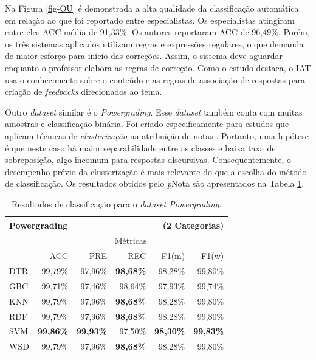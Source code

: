 Na Figura \ref{fig-OU} é demonstrada a alta qualidade da classificação automática em relação ao que foi reportado entre especialistas. Os especialistas atingiram entre eles ACC média de 91,33\%. Os autores \cite{butcher2010} reportaram ACC de 96,49\%. Porém, os três sistemas aplicados utilizam regras e expressões regulares, o que demanda de maior esforço para início das correções. Assim, o sistema deve aguardar enquanto o professor elabora as regras de correção. Como o estudo destaca, o IAT usa o conhecimento sobre o conteúdo e as regras de associação de respostas para criação de \textit{feedbacks} direcionados ao tema.

Outro \textit{dataset} similar é o \textit{Powergrading}. Esse \textit{dataset} também conta com muitas amostras e classificação binária. Foi criado especificamente para estudos que aplicam técnicas de \textit{clusterização} na atribuição de notas \cite{basu2013}. Portanto, uma hipótese é que neste caso há maior separabilidade entre as classes e baixa taxa de sobreposição, algo incomum para respostas discursivas. Consequentemente, o desempenho prévio da clusterização é mais relevante do que a escolha do método de classificação. Os resultados obtidos pelo \textit{p}Nota são apresentados na Tabela \ref{tab-PG}.

\begin{table}
\centering
\caption{Resultados de classificação para o \textit{dataset Powergrading}.}
\label{tab-PG}
\begin{tabular}{l r r r r r}
    \hline
    \multicolumn{4}{l}{\textbf{Powergrading}} & \multicolumn{2}{r}{(2 Categorias)} \\ \hline
     & \multicolumn{5}{c}{M{\'e}tricas} \\ \cline{2-6}

     & ACC & PRE & REC & F1(m) & F1(w) \\ \cline{2-6}
    DTR & 99,79\% & 97,96\% & \textbf{98,68\%} & 98,28\% & 99,80\% \\
    GBC & 99,71\% & 97,46\% & 98,64\% & 97,93\% & 99,74\% \\
    KNN & 99,79\% & 97,96\% & \textbf{98,68\%} & 98,28\% & 99,80\% \\
    RDF & 99,79\% & 97,96\% & \textbf{98,68\%} & 98,28\% & 99,80\% \\
    SVM & \textbf{99,86\%} & \textbf{99,93\%} & 97,50\% & \textbf{98,30\%} & \textbf{99,83\%} \\
    WSD & 99,79\% & 97,96\% & \textbf{98,68\%} & 98,28\% & 99,80\% \\

    \hline
    \hline
\end{tabular}
\end{table}


